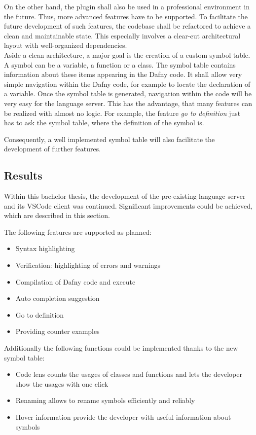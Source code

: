 On the other hand, the plugin shall also be used in a professional environment in the future.
Thus, more advanced features have to be supported.
To facilitate the future development of such features, the codebase shall be refactored to achieve a clean and maintainable state.
This especially involves a clear-cut architectural layout with well-organized dependencies.\\

Aside a clean architecture, a major goal is the creation of a custom symbol table.
A symbol can be a variable, a function or a class.
The symbol table contains information about these items appearing in the Dafny code.
It shall allow very simple navigation within the Dafny code, for example to locate the declaration of a variable.
Once the symbol table is generated, navigation within the code will be very easy for the language server.
This has the advantage, that many features can be realized with almost no logic.
For example, the feature \textit{go to definition} just has to ask the symbol table, where the definition of the symbol is.

Consequently, a well implemented symbol table will also facilitate the development of further features.

\subsection{Results}
Within this bachelor thesis, the development of the pre-existing language server and its VSCode client was continued.
Significant improvements could be achieved, which are described in this section.

The following features are supported as planned:
\begin{itemize}
    \item Syntax highlighting
    \item Verification: highlighting of errors and warnings
    \item Compilation of Dafny code and execute
    \item Auto completion suggestion
    \item Go to definition
    \item Providing counter examples
\end{itemize}

Additionally the following functions could be implemented thanks to the new symbol table:
\begin{itemize}
    \item Code lens counts the usages of classes and functions and lets the developer show the usages with one click
    \item Renaming allows to rename symbols efficiently and reliably
    \item Hover information provide the developer with useful information about symbols
\end{itemize}

